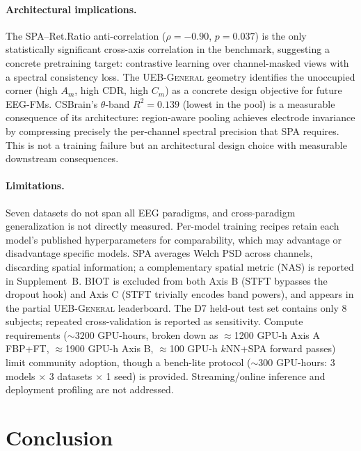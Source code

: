 \documentclass{article}
\newcommand{\cdr}{\textsc{CDR}\xspace}
\newcommand{\uebgen}{\textsc{UEB-General}\xspace}
\begin{document}
\paragraph{Architectural implications.}
The SPA--Ret.Ratio anti-correlation ($\rho = -0.90$, $p = 0.037$) is the only statistically significant cross-axis correlation in the benchmark, suggesting a concrete pretraining target: contrastive learning over channel-masked views with a spectral consistency loss. The \uebgen geometry identifies the unoccupied corner (high $A_m$, high \cdr, high $C_m$) as a concrete design objective for future EEG-FMs. CSBrain's $\theta$-band $R^2 = 0.139$ (lowest in the pool) is a measurable consequence of its architecture: region-aware pooling achieves electrode invariance by compressing precisely the per-channel spectral precision that SPA requires. This is not a training failure but an architectural design choice with measurable downstream consequences.

\paragraph{Limitations.}
Seven datasets do not span all EEG paradigms, and cross-paradigm generalization is not directly measured. Per-model training recipes retain each model's published hyperparameters for comparability, which may advantage or disadvantage specific models. SPA averages Welch PSD across channels, discarding spatial information; a complementary spatial metric (NAS) is reported in Supplement~B. BIOT is excluded from both Axis B (STFT bypasses the dropout hook) and Axis C (STFT trivially encodes band powers), and appears in the partial \uebgen leaderboard. The D7 held-out test set contains only 8 subjects; repeated cross-validation is reported as sensitivity. Compute requirements (${\sim}3200$ GPU-hours, broken down as $\approx$1200 GPU-h Axis A FBP+FT, $\approx$1900 GPU-h Axis B, $\approx$100 GPU-h $k$NN+SPA forward passes) limit community adoption, though a bench-lite protocol (${\sim}300$ GPU-hours: 3 models $\times$ 3 datasets $\times$ 1 seed) is provided. Streaming/online inference and deployment profiling are not addressed.

\section{Conclusion}
\label{sec:conclusion}
\end{document}
